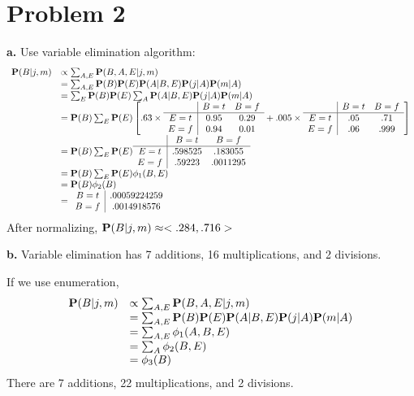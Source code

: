 \documentclass{mcmthesis}
\begin{document}
\section{Problem 2}
\textbf{a.} Use variable  elimination algorithm: 
$$ \begin{array}{cl}
\mathbf{P}(B|j,m) & \propto \sum_{A,E} \mathbf{P}(B,A,E|j,m) \\
& = \sum_{A,E}  \mathbf{P}(B) \mathbf{P}(E) \mathbf{P}(A|B,E) \mathbf{P}(j|A) \mathbf{P}(m|A) \\
& = \sum_E \mathbf{P}(B) \mathbf{P}(E) \sum_A \mathbf{P}(A|B,E) \mathbf{P}(j|A) \mathbf{P}(m|A) \\
&= \mathbf{P}(B) \sum_E \mathbf{P}(E) \left[ .63 \times \begin{array}{c|cc}
						& B=t & B=f \\ \hline 
						E=t&0.95 &0.29  \\ 
						E=f&0.94 &0.01 
						\end{array} 
						+
						.005 \times \begin{array}{c|cc}
						& B=t & B=f \\ \hline 
						E=t & .05  & .71 \\
						E=f & .06 & .999  
						\end{array}
						\right] \\
&= \mathbf{P}(B) \sum_E \mathbf{P}(E)  \begin{array}{c|cc}
						& B=t & B=f \\ \hline 
						E=t&.598525
						 & .183055 \\ 
						E=f&.59223 & .0011295 
						\end{array} \\
& = \mathbf{P}(B) \sum_E \mathbf{P}(E)  \phi_1(B,E) \\
&= \mathbf{P}(B) \phi_2(B) \\
& = \begin{array}{c|c}
	B=t & .00059224259 \\
	B=f & .0014918576
	\end{array}
\end{array}
$$
After normalizing, $\mathbf{P}(B|j,m) \approx <.284,.716>$

\noindent \textbf{b.} 
Variable elimination has  7 additions, 16 multiplications, and 2 divisions.

If we use enumeration,
$$\begin{array}{ll}
\mathbf{P}(B|j,m) & \propto \sum_{A,E} \mathbf{P}(B,A,E|j,m) \\
& = \sum_{A,E}  \mathbf{P}(B) \mathbf{P}(E) \mathbf{P}(A|B,E) \mathbf{P}(j|A) \mathbf{P}(m|A) \\
& = \sum_{A,E} \phi_1(A,B,E) \\
& = \sum_{A} \phi_2 (B,E) \\
& = \phi_3(B) 
\end{array}
$$
There are 7 additions, 22 multiplications, and 2 divisions. 
\end{document}
